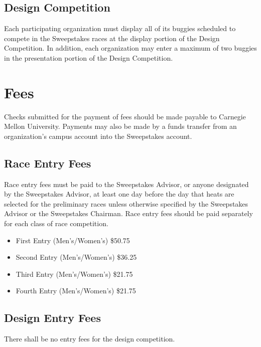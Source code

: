 \subsection{Design Competition}

	Each participating organization must display all of its buggies scheduled to
	compete in the Sweepstakes races at the display portion of the Design
	Competition. In addition, each organization may enter a maximum of two buggies
	in the presentation portion of the Design Competition.

\section{Fees}

	Checks submitted for the payment of fees should be made payable to Carnegie
	Mellon University. Payments may also be made by a funds transfer from an
	organization's campus account into the Sweepstakes account.

\subsection{Race Entry Fees}

	Race entry fees must be paid to the Sweepstakes Advisor, or anyone designated
	by the Sweepstakes Advisor, at least one day before the day that heats are
	selected for the preliminary races unless otherwise specified by the Sweepstakes Advisor
	or the Sweepstakes Chairman.
    Race entry fees should be paid separately for each class of race competition.

	\begin{itemize}
		\item First Entry (Men's/Women's) \$50.75
		\item Second Entry (Men's/Women's) \$36.25
		\item Third Entry (Men's/Women's) \$21.75
		\item Fourth Entry (Men's/Women's) \$21.75
	\end{itemize}

\subsection{Design Entry Fees}

	There shall be no entry fees for the design competition.


